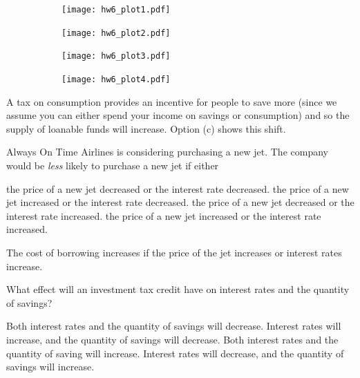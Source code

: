 \documentclass[addpoints,11pt]{exam}
\theoremstyle{definition}
\begin{document}
\begin{questions}
\begin{figure}[ht]
	\begin{subfigure}[b]{0.5\textwidth}
		\centering
	\texttt{[image: hw6\_plot1.pdf]}
		\caption{}
	\end{subfigure}
	\begin{subfigure}[b]{0.5\textwidth}
		\centering
	\texttt{[image: hw6\_plot2.pdf]}
		\caption{}
	\end{subfigure}
		
	\begin{subfigure}[b]{0.5\textwidth}
		\centering
		\texttt{[image: hw6\_plot3.pdf]}
		\caption{}
	\end{subfigure}
	\begin{subfigure}[b]{0.5\textwidth}
		\centering
		\texttt{[image: hw6\_plot4.pdf]}
		\caption{}
	\end{subfigure}
\end{figure}

\begin{solution}
	A tax on consumption provides an incentive for people to save more (since we assume you can either spend your income on savings or consumption) and so the supply of loanable funds will increase. Option (c) shows this shift.
\end{solution}

\question Always On Time Airlines is considering purchasing a new jet. The company would be \textit{less} likely to purchase a new jet if either

\begin{choices}
	\choice the price of a new jet decreased or the interest rate decreased.
	\choice the price of a new jet increased or the interest rate decreased.
	\choice the price of a new jet decreased or the interest rate increased.
	\CorrectChoice the price of a new jet increased or the interest rate increased.
\end{choices}

\begin{solution}
	The cost of borrowing increases if the price of the jet increases or interest rates increase.
\end{solution}

\newpage

\question What effect will an investment tax credit have on interest rates and the quantity of savings?

\begin{choices}
	\choice Both interest rates and the quantity of savings will decrease.
	\choice Interest rates will increase, and the quantity of savings will decrease.
	\CorrectChoice Both interest rates and the quantity of saving will increase.
	\choice Interest rates will decrease, and the quantity of savings will increase.
\end{choices}


\end{questions}
\end{document}
